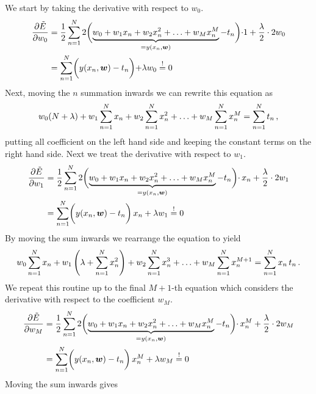 \documentclass[11pt, DINA4, fleqn]{amsart}
\def\vw{\boldsymbol{w}\xspace}
\begin{document}
We start by taking the derivative with respect to $w_0$.
\begin{align}
\dfrac{\partial \tilde{E}}{\partial w_0} &= \dfrac{1}{2}\sum \displaylimits_{n = 1}^{N}
2 \biggl(\underbrace{w_0 + w_1 x_n + w_2 x_n^2 + \dotsc + w_M x_n^M}_{=y(x_n,\vw)} - t_n\biggl) \cdot 1
+ \dfrac{\lambda}{2} \cdot 2 w_0 \\
&=\sum \displaylimits_{n = 1}^{N} \biggl(y(x_n,\vw) - t_n\biggl) + \lambda w_0 \overset{!}{=} 0
\end{align}
Next, moving the $n$ summation inwards we can rewrite this equation as
\begin{align}
w_0 (N + \lambda) + w_1 \sum \displaylimits_{n = 1}^{N} x_n 
+ w_2 \sum \displaylimits_{n = 1}^{N} x_n^2 + \dotsc 
+ w_M \sum \displaylimits_{n = 1}^{N} x_n^M = \sum \displaylimits_{n = 1}^{N} t_n \, ,
\end{align}
putting all coefficient on the left hand side and keeping the constant terms on the right hand side.
Next we treat the derivative with respect to $w_1$.
\begin{align}
\dfrac{\partial \tilde{E}}{\partial w_1} &= \dfrac{1}{2}\sum \displaylimits_{n = 1}^{N}
2 \biggl(\underbrace{w_0 + w_1 x_n + w_2 x_n^2 + \dotsc + w_M x_n^M}_{=y(x_n,\vw)} - t_n\biggl) \cdot \, x_n
+ \dfrac{\lambda}{2} \cdot 2 w_1 \\
&=\sum \displaylimits_{n = 1}^{N} \biggl(y(x_n,\vw) - t_n\biggl) \, x_n + \lambda w_1 \overset{!}{=} 0
\end{align}
By moving the sum inwards we rearrange the equation to yield
\begin{align}
w_0 \sum \displaylimits_{n = 1}^{N} x_n 
+ w_1 \left( \lambda + \sum \displaylimits_{n = 1}^{N} x_n^2 \right) 
+ w_2 \sum \displaylimits_{n = 1}^{N} x_n^3 + \dotsc 
+ w_M \sum \displaylimits_{n = 1}^{N} x_n^{M + 1} = \sum \displaylimits_{n = 1}^{N} x_n \, t_n \, .
\end{align}
We repeat this routine up to the final $M+1$-th equation which considers the derivative with respect to the coefficient $w_M$.
\begin{align}
\dfrac{\partial \tilde{E}}{\partial w_M} &= \dfrac{1}{2}\sum \displaylimits_{n = 1}^{N}
2 \biggl(\underbrace{w_0 + w_1 x_n + w_2 x_n^2 + \dotsc + w_M x_n^M}_{=y(x_n,\vw)} - t_n\biggl) \cdot \, x_n^M
+ \dfrac{\lambda}{2} \cdot 2 w_M \\
&=\sum \displaylimits_{n = 1}^{N} \biggl(y(x_n,\vw) - t_n\biggl) \, x_n^M + \lambda w_M \overset{!}{=} 0
\end{align}
Moving the sum inwards gives
\end{document}
